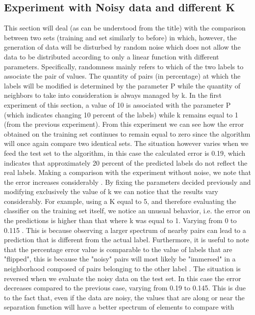 \documentclass[a4paper,10pt,oneside]{article}
\begin{document}
\subsection{ Experiment with Noisy data and different K }
\label{ssec:noisy}
This section will deal (as can be understood from the title) with the comparison 
between two sets (training and set similarly to before) in which, however, 
the generation of data will be disturbed by random noise which does not 
allow the data to be distributed according to only a linear function with 
different parameters.
Specifically, randomness mainly refers to which of the two labels to associate the pair of 
values.
The quantity of pairs (in percentage) at which the labels will be modified is 
determined by the parameter P while the quantity of neighbors to take into
consideration is always managed by k. 
In the first experiment of this section, a value of 10 is associated with 
the parameter P (which indicates changing 10 percent of the labels) while k 
remains equal to 1 (from the previous experiment).
From this experiment we can see how the error obtained on the training set continues 
to remain equal to zero since the algorithm will once again compare two identical sets.
The situation however varies when we feed the test set to the algorithm, in this case the 
calculated error is 0.19, which indicates that approximately 20 percent of the predicted 
labels do not reflect the real labels.
Making a comparison with the experiment without noise, we note that the error increases 
considerably . 
By fixing the parameters decided previously and modifying exclusively the value of k 
we can notice that the results vary considerably. 
For example, using a K equal to 5, and therefore evaluating the classifier on the
training set itself, we notice an unusual behavior, i.e. the error 
on the predictions is higher than that where k was equal to 1. 
Varying from 0 to 0.115 .
This is because observing a larger spectrum of nearby pairs can lead to a
prediction that is different from the actual label.
Furthermore, it is useful to note that the percentage error value is comparable 
to the value of labels that are "flipped", this is because the "noisy" pairs 
will most likely be "immersed" in a neighborhood composed of pairs belonging
to the other label .
The situation is reversed when we evaluate the noisy data on the test set. 
In this case the error decreases compared to the previous case, varying from 0.19 to 0.145.
This is due to the fact that, even if the data are noisy, the values that are along or 
near the separation function will have a better spectrum of elements to compare with
\end{document}
